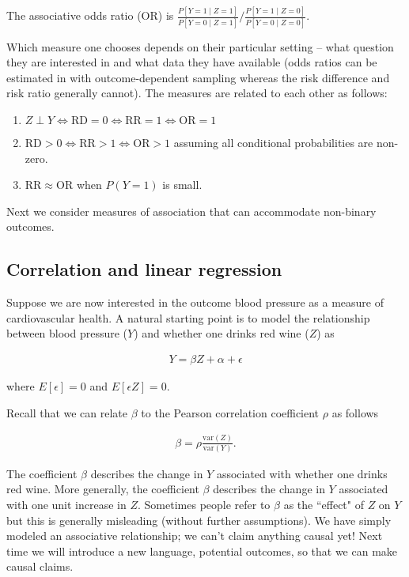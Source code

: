 \documentclass[11pt]{elegantbook}
\begin{document}
\begin{definition}
    The associative odds ratio (OR) is $\frac{P[Y =1 \mid Z = 1]}{P[Y =0 \mid Z = 1]}/\frac{P[Y=1 \mid Z = 0]}{P[Y=0 \mid Z = 0]}$.
\end{definition}

Which measure one chooses depends on their particular setting -- what question they are interested in and what data they have available (odds ratios can be estimated in with outcome-dependent sampling whereas the risk difference and risk ratio generally cannot). The measures are related to each other as follows:

\begin{enumerate}
    \item $Z \perp Y  \Longleftrightarrow \mathrm{RD} = 0 \Longleftrightarrow \mathrm{RR} = 1 \Longleftrightarrow \mathrm{OR} = 1$
    \item $\mathrm{RD} > 0 \Longleftrightarrow \mathrm{RR} > 1 \Longleftrightarrow \mathrm{OR} > 1$ assuming all conditional probabilities are non-zero.
    \item $\mathrm{RR} \approx \mathrm{OR}$ when $P(Y=1)$ is small.
\end{enumerate}

Next we consider measures of association that can accommodate non-binary outcomes. 

\subsection{Correlation and linear regression}
Suppose we are now interested in the outcome blood pressure as a measure of cardiovascular health. A natural starting point is to model the relationship between blood pressure ($Y$) and whether one drinks red wine ($Z$) as 

\begin{align*}
    Y = \beta Z + \alpha + \epsilon
\end{align*}

where $E[\epsilon] = 0 $ and $E[\epsilon Z ] = 0$.

Recall that we can relate $\beta$ to the Pearson correlation coefficient $\rho$ as follows

\begin{align*}
    \beta = \rho \frac{\mathrm{var}(Z)}{\mathrm{var}(Y)}.
\end{align*}

The coefficient $\beta$ describes the change in $Y$ associated with whether one drinks red wine. More generally, the coefficient $\beta$ describes the change in $Y$ associated with one unit increase in $Z$.
Sometimes people refer to $\beta$ as the ``effect" of $Z$ on $Y$ but this is generally misleading (without further assumptions). We have simply modeled an associative relationship; we can't claim anything causal yet! Next time we will introduce a new language, potential outcomes, so that we can make causal claims.
\end{document}
